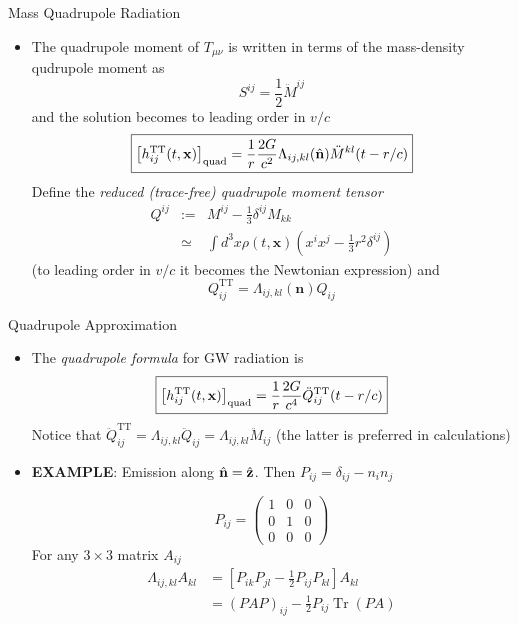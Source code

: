 \documentclass[size=11pt,style=paintings]{powerdot}
\begin{document}
\begin{slide}{Mass Quadrupole Radiation}
 \begin{itemize}
 \item The quadrupole moment of $T_{\mu\nu}$  is written in terms of the mass-density qudrupole moment as
 $$
\boxed{S^{i j}=\frac{1}{2} \ddot{M}^{i j}}
$$
 and the solution becomes to leading order in $v/c$
$$
\boxed{\left[h_{i j}^{\rm TT}(t, \mathbf{x})\right]_{\mathrm{quad}}=\frac{1}{r} \frac{2 G}{c^{2}} \Lambda_{i j, k l}(\hat{\mathbf{n}}) \ddot{M}^{k l}(t-r / c)}
$$
Define the \textit{reduced (trace-free) quadrupole moment tensor}
\begin{eqnarray}
Q^{i j} &:=& M^{i j}-\frac{1}{3} \delta^{i j} M_{k k} \\
&\simeq& \int d^{3} x \rho(t, \mathbf{x})\left(x^{i} x^{j}-\frac{1}{3} r^{2} \delta^{i j}\right)
\end{eqnarray}
(to leading order in $v/c$ it becomes the Newtonian expression) and
$$
Q_{i j}^{\mathrm{TT}}=\Lambda_{i j, k l}(\mathbf{n}) Q_{i j}
$$
 \end{itemize}
 \end{slide}


\begin{slide}{Quadrupole Approximation}
 \begin{itemize}
 \item The \textit{quadrupole formula} for GW radiation is
 $$
\boxed{\left[h_{i j}^{\rm TT}(t, \mathbf{x})\right]_{\mathrm{quad}}=\frac{1}{r} \frac{2 G}{c^{4}} \ddot{Q}_{i j}^{\mathrm{TT}}(t-r / c)}
$$
 Notice that $
\ddot Q_{i j}^{\mathrm{TT}}=\Lambda_{i j, k l} \ddot{Q}_{i j}=\Lambda_{i j, k l} \ddot{M}_{i j}
$ (the latter is preferred in calculations)

\vspace{0.3cm}

\item \textbf{EXAMPLE}: Emission along $\hat{\bf n}=\hat{\bf z}$. Then $
P_{i j}=\delta_{i j}-n_{i} n_{j} $

$$
P_{ij}=\left(\begin{array}{lll}{1} & {0} & {0} \\ {0} & {1} & {0} \\ {0} & {0} & {0}\end{array}\right)
$$
For any $3\times 3$ matrix $A_{ij}$
$$
\begin{aligned} \Lambda_{i j, k l} A_{k l} &=\left[P_{i k} P_{j l}-\frac{1}{2} P_{i j} P_{k l} \right] A_{kl} \\ &=(P A P)_{i j}-\frac{1}{2} P_{i j} \operatorname{Tr}(P A) \end{aligned}
$$
 \end{itemize}
 \end{slide}
\end{document}

